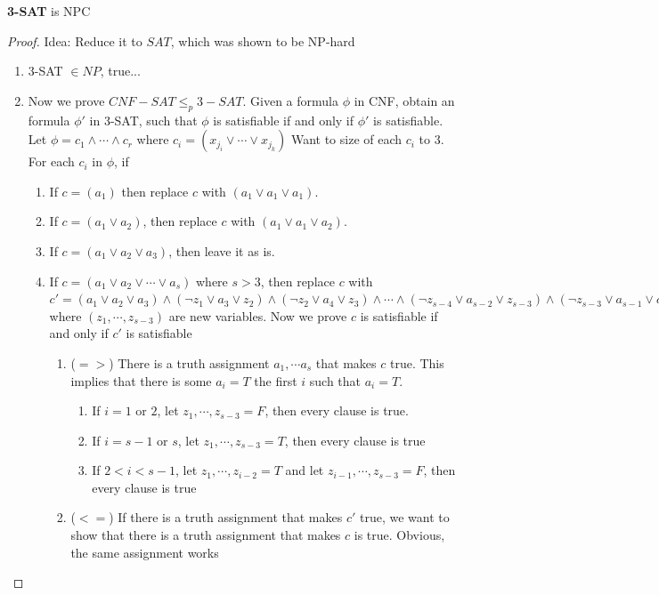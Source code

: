 \documentclass[11pt]{article}
\begin{document}
\begin{proposition*}
    \textbf{3-SAT} is NPC 
    \begin{proof}
        Idea: Reduce it to $SAT$, which was shown to be NP-hard
        \begin{enumerate}
            \item 3-SAT $\in NP$, true...
            \item Now we prove $CNF-SAT \leq_p 3-SAT$. Given a formula $\phi$ in CNF, obtain an formula $\phi'$ in 3-SAT, such that $\phi$ is satisfiable if and only if $\phi'$ is satisfiable. Let $\phi = c_1 \land \cdots \land c_r$ where $c_i = (x_{j_i} \lor \cdots \lor x_{j_k})$ Want to size of each $c_i$ to 3. For each $c_i$ in $\phi$, if 
            \begin{enumerate}
                \item If $c= (a_1)$ then replace $c$ with $(a_1 \lor a_1 \lor a_1)$.
                \item If $c = (a_1 \lor a_2)$, then replace $c$ with  $(a_1 \lor a_1 \lor a_2)$. 
                \item If $c =  (a_1 \lor a_2 \lor a_3)$, then leave it as is. 
                \item If $c = (a_1 \lor a_2 \lor \cdots \lor a_s)$ where $s>3$, then replace $c$ with $c' = (a_1 \lor a_2 \lor a_3) \land (\neg z_1 \lor a_3 \lor z_2) \land (\neg z_2 \lor a_4 \lor z_3) \land \cdots \land (\neg z_{s-4} \lor a_{s-2} \lor z_{s-3}) \land (\neg z_{s-3}\lor a_{s-1} \lor a_{s})$  where $(z_1,\cdots, z_{s-3})$ are new variables. Now we prove $c$ is satisfiable if and only if $c'$ is satisfiable 
                
                \begin{enumerate}
                    \item ($=>$) There is a truth assignment $a_1,\cdots a_s$ that makes $c$ true. This implies that there is some $a_i = T$ the first $i$ such that $a_i = T$.
                    \begin{enumerate}
                        \item  If $i = 1$ or $2$, let $z_1,\cdots, z_{s-3} = F$, then every clause is true. 
                        \item If $i = s-1$ or $s$, let $z_1,\cdots, z_{s-3} = T$, then every clause is true 
                        \item If $2<i<s-1$, let $z_1,\cdots, z_{i-2} = T$ and let $z_{i-1},\cdots, z_{s-3} = F$, then every clause is true  
                    \end{enumerate}
                    \item ($<=$) If there is a truth assignment that makes $c'$ true, we want to show that there is a truth assignment that makes $c$ is true. Obvious, the same assignment works
                \end{enumerate}

            \end{enumerate}
            
            
           
        \end{enumerate}
    \end{proof}
\end{proposition*}
\end{document}
